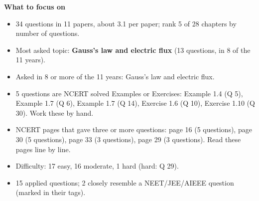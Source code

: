 \begin{minipage}[t]{0.63\linewidth}{\small\textbf{\color{crimson}What to focus on}\par\smallskip
\begin{itemize}[leftmargin=1.1em,itemsep=1pt,topsep=0pt]
\item 34 questions in 11 papers, about 3.1 per paper; rank 5 of 28 chapters by number of questions.
\item Most asked topic: \textbf{Gauss's law and electric flux} (13 questions, in 8 of the 11 years).
\item Asked in 8 or more of the 11 years: Gauss's law and electric flux.
\item 5 questions are NCERT solved Examples or Exercises: Example 1.4 (Q 5), Example 1.7 (Q 6), Example 1.7 (Q 14), Exercise 1.6 (Q 10), Exercise 1.10 (Q 30). Work these by hand.
\item NCERT pages that gave three or more questions: page 16 (5 questions), page 30 (5 questions), page 33 (3 questions), page 29 (3 questions). Read these pages line by line.
\item Difficulty: 17 easy, 16 moderate, 1 hard (hard: Q 29).
\item 15 applied questions; 2 closely resemble a NEET/JEE/AIEEE question (marked in their tags).
\end{itemize}}\end{minipage}\par
{}
